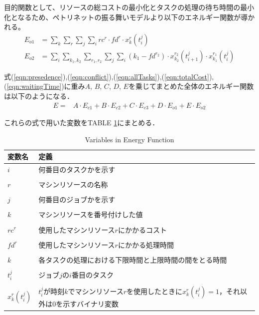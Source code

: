 \documentclass[conference]{IEEEtran}
\begin{document}
目的関数として、リソースの総コストの最小化とタスクの処理の待ち時間の最小化となるため、ペトリネットの振る舞いモデルより以下のエネルギー関数が導かれる。
\begin{align}
E_{o1} &=\sum_k \sum_r \sum_j \sum_i rc^r \cdot fd^r \cdot x_{k}^{r}(t_{i}^{j}) \label{eqn:totalCost}\\
E_{o2} &= \sum_i \sum_{k_1,k_2} \sum_{r_1,r_2} \sum_j \sum_i ({k_1 - fd^{r_2}}) \cdot x_{k_2}^{r_2}(t_{i+1}^{j}) \cdot x_{k_1}^{r_1}(t_{i}^{j}) \label{eqn:waitingTime}
\end{align}


式(\ref{eqn:presedence}),(\ref{eqn:conflict}),(\ref{eqn:allTasks}),(\ref{eqn:totalCost}),(\ref{eqn:waitingTime})に重み$A$, $B$, $C$, $D$, $E$を乗じてまとめた全体のエネルギー関数は以下のようになる．
\begin{align}
E = 
&A \cdot E_{c1} + B \cdot E_{c2} + C \cdot E_{c3} + D \cdot E_{o1} + E \cdot E_{o2}
\end{align}

これらの式で用いた変数をTABLE \ref{variable}にまとめる．

\begin{table}[h]
\centering
\caption{Variables in Energy Function}
\begin{tabularx}{0.45\textwidth}{>{\centering\arraybackslash}p{1.7cm}|X}
\hline
変数名 & 定義 \\ \hline 
$i$ & 何番目のタスクかを示す  \\ 
 & \\
$r$ & マシンリソースの名称 \\ 
 & \\
$j$ & 何番目のジョブかを示す \\ 
 & \\
$k$ & マシンリソースを番号付けした値 \\ 
 & \\
$rc^r$ & 使用したマシンリソース$r$にかかるコスト  \\ 
 & \\
$fd^r$ & 使用したマシンリソース$r$にかかる処理時間  \\ 
 & \\
$k$ & 各タスクの処理における下限時間と上限時間の間をとる時間  \\ 
 & \\
$t_{i}^{j}$ & ジョブ$j$の$i$番目のタスク  \\ 
 & \\
 $x_{k}^{r}(t_{i}^{j})$ & $t_{i}^{j}$が時刻$k$でマシンリソース$r$を使用したときに$x_{k}^{r}(t_{i}^{j})=1$，それ以外は0を示すバイナリ変数 \\ \hline

\end{tabularx}
\label{variable}
\end{table}
\end{document}
